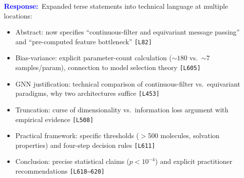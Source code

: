 \documentclass[11pt]{article}
\newcommand{\response}{\textcolor{blue}{\textbf{Response:}}~}
\newcommand{\lines}[1]{\texttt{[L#1]}}
\begin{document}
\response Expanded terse statements into technical language at multiple locations:
\begin{itemize}[itemsep=1pt, topsep=2pt]
    \item Abstract: now specifies ``continuous-filter and equivariant message passing'' and ``pre-computed feature bottleneck'' \lines{82}
    \item Bias-variance: explicit parameter-count calculation (${\sim}180$ vs.\ ${\sim}7$ samples/param), connection to model selection theory \lines{605}
    \item GNN justification: technical comparison of continuous-filter vs.\ equivariant paradigms, why two architectures suffice \lines{453}
    \item Truncation: curse of dimensionality vs.\ information loss argument with empirical evidence \lines{508}
    \item Practical framework: specific thresholds ($>$500 molecules, solvation properties) and four-step decision rules \lines{611}
    \item Conclusion: precise statistical claims ($p < 10^{-4}$) and explicit practitioner recommendations \lines{618--620}
\end{itemize}
\end{document}
